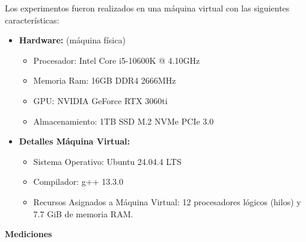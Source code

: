 Los experimentos fueron realizados en una máquina virtual con las siguientes características:

\begin{itemize}
\item \textbf{Hardware:} (máquina física)
    \begin{itemize}
    \item Procesador: Intel Core i5-10600K @ 4.10GHz
    \item Memoria Ram: 16GB DDR4 2666MHz
    \item GPU: NVIDIA GeForce RTX 3060ti
    \item Almacenamiento: 1TB SSD M.2 NVMe PCIe 3.0 
    \end{itemize}

\item \textbf{Detalles Máquina Virtual:}
    \begin{itemize}
    \item Sistema Operativo: Ubuntu 24.04.4 LTS
    \item Compilador: g++ 13.3.0
    \item Recursos Asignados a Máquina Virtual: 12 procesadores lógicos (hilos) y 7.7 GiB de memoria RAM.
    \end{itemize} 

\end{itemize} 

\textbf{Mediciones}

